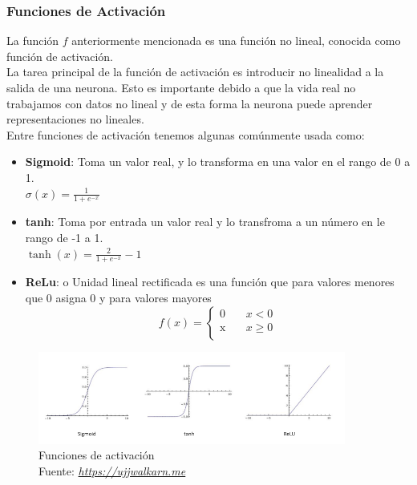 \subsubsection{Funciones de Activación}
La función $f$ anteriormente mencionada es una función no lineal, conocida como función de activación.\\ La tarea principal de la función de activación es introducir no linealidad a la salida de una neurona. Esto es importante debido a que la vida real no trabajamos con datos no lineal y de esta forma la neurona puede aprender representaciones no lineales.\\ Entre funciones de activación tenemos algunas comúnmente usada como:
\begin{itemize}
	\item \textbf{Sigmoid}: Toma un valor real, y lo transforma en una valor en el rango de 0 a 1.\\
	$ \sigma (x) = \frac{1}{1+e^{-x}}$
	\item \textbf{tanh}: Toma por entrada un valor real y lo transfroma a un número en le rango de -1 a 1.\\
	$\tanh (x)=\frac{2}{1+e^{-x}} -1$
	\item \textbf{ReLu}: o Unidad lineal rectificada es una función que para valores menores que 0 asigna 0 y para valores mayores 
	\[   
	f(x) = 
	\begin{cases}
	\text{0} &\quad x<0\\
	\text{x} &\quad x\geq0\\

	\end{cases}
	\]
\end{itemize}
\begin{figure}[H]
	\centering
	\includegraphics[width=0.9\textwidth]{Figures/factivacion.png}
	\caption{Funciones de activación \\ Fuente:  \href{https://ujjwalkarn.me/2016/08/09/quick-intro-neural-networks/}{\textit{https://ujjwalkarn.me}}}
	\label{activacion}
\end{figure} 

